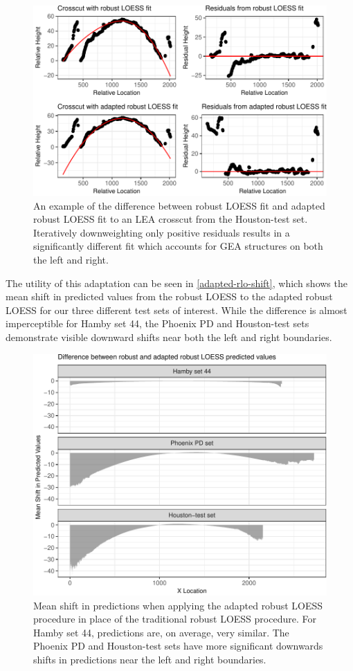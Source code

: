 \documentclass[12pt]{article}
\begin{document}
\begin{figure}
\centering
\includegraphics{writeup_files/figure-latex/houston-adapted-rlo-1.pdf}
\caption{\label{houston-adapted-rlo}An example of the difference between
robust LOESS fit and adapted robust LOESS fit to an LEA crosscut from
the Houston-test set. Iteratively downweighting only positive residuals
results in a significantly different fit which accounts for GEA
structures on both the left and right.}
\end{figure}

The utility of this adaptation can be seen in
\autoref{adapted-rlo-shift}, which shows the mean shift in predicted
values from the robust LOESS to the adapted robust LOESS for our three
different test sets of interest. While the difference is almost
imperceptible for Hamby set 44, the Phoenix PD and Houston-test sets
demonstrate visible downward shifts near both the left and right
boundaries.

\begin{figure}
\centering
\includegraphics{writeup_files/figure-latex/adapted-rlo-shift-1.pdf}
\caption{\label{adapted-rlo-shift}Mean shift in predictions when
applying the adapted robust LOESS procedure in place of the traditional
robust LOESS procedure. For Hamby set 44, predictions are, on average,
very similar. The Phoenix PD and Houston-test sets have more significant
downwards shifts in predictions near the left and right boundaries.}
\end{figure}
\end{document}

